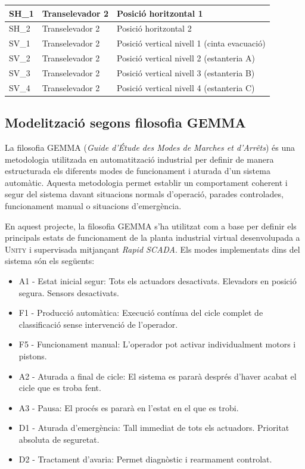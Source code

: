 \documentclass[a4paper,11pt,DIV=13,headings=normal,abstract=true,twoside=semi]{article}
\newcommand{\acro}[1]{\textsc{#1}}
\begin{document}
\begin{table}[H]
\begin{tabular}{|p{3cm}|p{5cm}|p{6cm}|}
SH\_1 & Transelevador 2 & Posició horitzontal 1 \\ \hline
SH\_2 & Transelevador 2 & Posició horitzontal 2 \\ \hline

SV\_1 & Transelevador 2 & Posició vertical nivell 1 (cinta evacuació)\\ \hline
SV\_2 & Transelevador 2 & Posició vertical nivell 2 (estanteria A)\\ \hline
SV\_3 & Transelevador 2 & Posició vertical nivell 3 (estanteria B)\\ \hline
SV\_4 & Transelevador 2 & Posició vertical nivell 4 (estanteria C)\\ \hline
\end{tabular}
\end{table}

\subsection{Modelització segons filosofia GEMMA}

La filosofia \acro{GEMMA} (\emph{Guide d'Étude des Modes de Marches et d'Arrêts}) és una metodologia utilitzada en automatització industrial per definir de manera estructurada els diferents modes de funcionament i aturada d'un sistema automàtic. Aquesta metodologia permet establir un comportament coherent i segur del sistema davant situacions normals d'operació, parades controlades, funcionament manual o situacions d'emergència.

En aquest projecte, la filosofia \acro{GEMMA} s'ha utilitzat com a base per definir els principals estats de funcionament de la planta industrial virtual desenvolupada a \acro{Unity} i supervisada mitjançant \emph{Rapid SCADA}. Els modes implementats dins del sistema són els següents:
\begin{itemize}
    \item A1 - Estat inicial segur: Tots els actuadors desactivats. Elevadors en posició segura. Sensors desactivats.
    \item F1 - Producció automàtica: Execució contínua del cicle complet de classificació sense intervenció de l'operador.
    \item F5 - Funcionament manual: L'operador pot activar individualment motors i pistons.
    \item A2 - Aturada a final de cicle: El sistema es pararà després d'haver acabat el cicle que es troba fent.
    \item A3 - Pausa: El procés es pararà en l'estat en el que es trobi.
    \item D1 - Aturada d'emergència: Tall immediat de tots els actuadors. Prioritat absoluta de seguretat.
    \item D2 - Tractament d'avaria: Permet diagnòstic i rearmament controlat.
\end{itemize}
\end{document}
